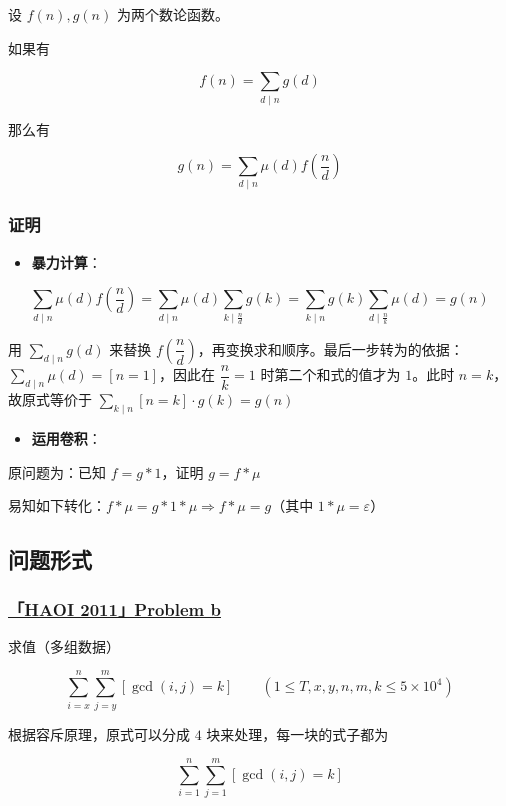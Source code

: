 设 $f(n),g(n)$ 为两个数论函数。

如果有

$$
f(n)=\sum_{d\mid n}g(d)
$$

那么有

$$
g(n)=\sum_{d\mid n}\mu(d)f(\frac{n}{d})
$$

\subsubsection{证明}

\begin{itemize}
\item \textbf{暴力计算}：
\end{itemize}

$$
\sum_{d\mid n}\mu(d)f(\frac{n}{d})=\sum_{d\mid n}\mu(d)\sum_{k\mid \frac{n}{d}}g(k)=\sum_{k\mid n}g(k)\sum_{d\mid \frac{n}{k}}\mu(d)=g(n)
$$

用 $\displaystyle\sum_{d\mid n}g(d)$ 来替换 $f(\dfrac{n}{d})$，再变换求和顺序。最后一步转为的依据：$\displaystyle\sum_{d\mid n}\mu(d)=[n=1]$，因此在 $\dfrac{n}{k}=1$ 时第二个和式的值才为 $1$。此时 $n=k$，故原式等价于 $\displaystyle\sum_{k\mid n}[n=k]\cdot g(k)=g(n)$

\begin{itemize}
\item \textbf{运用卷积}：
\end{itemize}

原问题为：已知 $f=g*1$，证明 $g=f*\mu$

易知如下转化：$f*\mu=g*1*\mu\Rightarrow f*\mu=g$（其中 $1*\mu=\varepsilon$）

\hr

\subsection{问题形式}

\subsubsection{\href{https://www.lydsy.com/JudgeOnline/problem.php?id=2301}{「HAOI 2011」Problem b}}

求值（多组数据）

$$
\sum_{i=x}^{n}\sum_{j=y}^{m}[\gcd(i,j)=k]\qquad (1\leqslant T,x,y,n,m,k\leqslant 5\times 10^4)
$$

根据容斥原理，原式可以分成 $4$ 块来处理，每一块的式子都为

$$
\sum_{i=1}^{n}\sum_{j=1}^{m}[\gcd(i,j)=k]
$$

